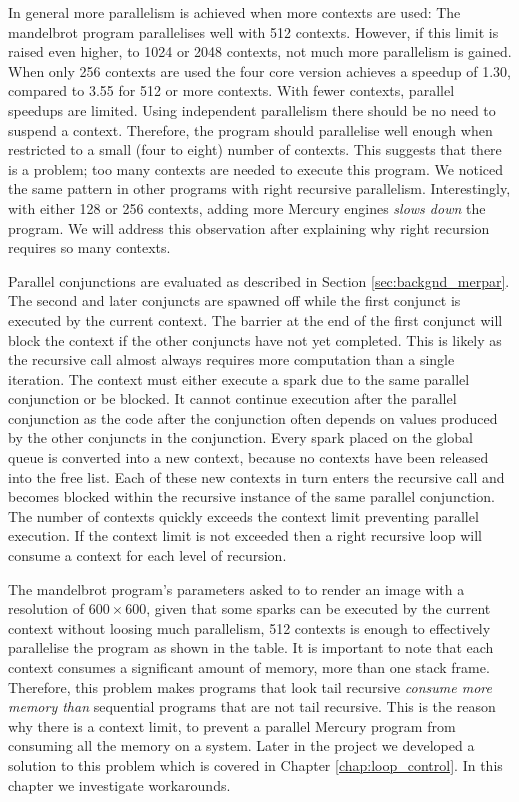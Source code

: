 In general more parallelism is achieved when more contexts are used:
The mandelbrot program parallelises well with 512 contexts.
However,
if this limit is raised even higher,
to 1024 or 2048 contexts,
not much more parallelism is gained.
When only 256 contexts are used the four core version achieves a speedup
of 1.30,
compared to 3.55 for 512 or more contexts.
With fewer contexts, parallel speedups are limited.
Using independent parallelism there should be no need to suspend a context.
Therefore, the program should parallelise well enough when restricted to
a small (four to eight) number of contexts.
This suggests that there is a problem;
too many contexts are needed to execute this program.
We noticed the same pattern in other programs with right recursive
parallelism.
Interestingly,
with either 128 or 256 contexts,
adding more Mercury engines \emph{slows down} the program.
We will address this observation after explaining why right recursion
requires so many contexts.

\label{context_limit}
Parallel conjunctions are evaluated as described in Section
\ref{sec:backgnd_merpar}.
The second and later conjuncts are spawned off while the first conjunct is
executed by the current context.
The barrier at the end of the first conjunct will block the context if
the other conjuncts have not yet completed.
This is likely as the recursive call almost always requires more
computation than a single iteration.
The context must either execute a spark due to the same parallel
conjunction or be blocked.
It cannot continue execution after the parallel conjunction as the code
after the conjunction often depends on values produced by the other
conjuncts in the conjunction.
Every spark placed on the global queue is converted into a new context,
because no contexts have been released into the free list.
Each of these new contexts in turn enters the recursive call and
becomes blocked within the recursive instance of the same parallel
conjunction.
The number of contexts quickly exceeds the context limit preventing
parallel execution.
If the context limit is not exceeded then a right recursive loop will
consume a context for each level of recursion.

The mandelbrot program's parameters asked to to render an image with a
resolution of $600\times600$,
given that some sparks can be executed by the current context without
loosing much parallelism,
512 contexts is enough to effectively parallelise the program as shown in
the table.
It is important to note that each context consumes a significant amount
of memory, more than one stack frame.
Therefore,
this problem makes programs that look tail recursive
\emph{consume more memory than}
sequential programs that are not tail recursive.
This is the reason why there is a context limit,
to prevent a parallel Mercury program from consuming all the memory on a
system.
Later in the project we developed a solution to this problem which is
covered in Chapter \ref{chap:loop_control}.
In this chapter we investigate workarounds.


